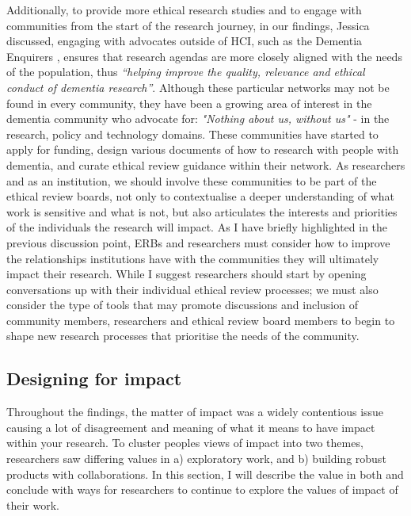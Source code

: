 Additionally, to provide more ethical research studies and to engage with communities from the start of the research journey, in our findings, Jessica discussed, engaging with advocates outside of HCI, such as the Dementia Enquirers \cite{davies2021dementia} , ensures that research agendas are more closely aligned with the needs of the population, thus \textit{“helping improve the quality, relevance and ethical conduct of dementia research”}. Although these particular networks may not be found in every community, they have been a growing area of interest in the dementia community who advocate for: \textit{"Nothing about us, without us"} \cite{spiel_nothing_2020} - in the research, policy and technology domains. These communities have started to apply for funding, design various documents of how to research with people with dementia, and curate ethical review guidance within their network. As researchers and as an institution, we should involve these communities to be part of the ethical review boards, not only to contextualise a deeper understanding of what work is sensitive and what is not, but also articulates the interests and priorities of the individuals the research will impact. As I have briefly highlighted in the previous discussion point, ERBs and researchers must consider how to improve the relationships institutions have with the communities they will ultimately impact their research. While I suggest researchers should start by opening conversations up with their individual ethical review processes; we must also consider the type of tools that may promote discussions and inclusion of community members, researchers and ethical review board members to begin to shape new research processes that prioritise the needs of the community. 

\subsection{Designing for impact}
\label{Discussion:Impact}
Throughout the findings, the matter of impact was a widely contentious issue causing a lot of disagreement and meaning of what it means to have impact within your research. To cluster peoples views of impact into two themes, researchers saw differing values in a) exploratory work, and b) building robust products with collaborations. In this section, I will describe the value in both and conclude with ways for researchers to continue to explore the values of impact of their work. 

